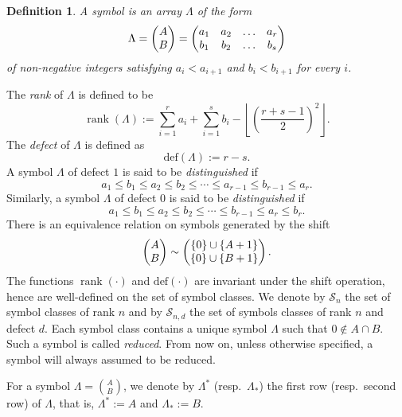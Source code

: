 \documentclass[12pt]{amsart}
\numberwithin{equation}{subsection}
\newtheorem{defn}[equation]{Definition}
\newcommand{\cS}{\mathcal{S}}
\newcommand{\rank}{\operatorname{rank}}
\def\defect{{\mathrm{def}}}
\begin{document}
\begin{defn} {\rm 
A \textit{symbol} is an array $\Lambda$ of the form 
\[ \Lambda=\left(\begin{matrix}  A\cr B\end{matrix}\right)=\left(\begin{matrix} a_1&a_2&\ldots&a_{r}\cr 
b_1&b_2&\ldots&b_{s}\end{matrix}\right)\]
of non-negative integers satisfying
 $a_i<a_{i+1}$ and $b_i<b_{i+1}$ for every $i$.}
\end{defn}
The \textit{rank}  of $\Lambda$ is defined to be
\[\rank(\Lambda):=\sum_{i=1}^r a_i+ \sum_{i=1}^s b_i-\left\lfloor\left(\frac{r+s-1}{2}\right)^2\right\rfloor.\]
The \textit{defect} of $\Lambda$ is defined as
\[\defect(\Lambda):=r-s.\]
A symbol $\Lambda$ of defect $1$  is said to be \textit{distinguished} if
\[a_1\le b_1\le a_2\le b_2\le\cdots\le a_{r-1}\le b_{r-1}\le a_{r}.\]
Similarly, a symbol $\Lambda$ of defect $0$ is said to be \textit{distinguished} if
\[a_1\le b_1\le a_2\le b_2\le\cdots\le b_{r-1}\le a_r\le b_r.\]
There is an equivalence relation on symbols generated by the shift
\begin{equation}
\left(\begin{matrix}  A\cr B\end{matrix}\right) \sim \left(\begin{matrix} \{0\}\cup\{A+1\}\cr  \{0\}\cup\{B+1\}\end{matrix}\right).
\end{equation}
The functions $\rank(\cdot)$ and $\defect(\cdot)$ are invariant under the shift operation, hence are well-defined on the set
of symbol classes.
We denote by $\cS_{n}$ the set of symbol classes of rank $n$ and by $\cS_{n,d}$ the set of symbols classes of rank $n$ and defect $d$.
Each symbol class contains a unique symbol $\Lambda$ such that $0\notin A\cap B$. Such a symbol is called \textit{reduced}. From now on, unless otherwise specified, a symbol will always assumed to be reduced.

For a symbol $\Lambda=\binom{A}{B}$, we denote by $\Lambda^\ast$ (resp.~$\Lambda_\ast$) the first row (resp.~second row)
of $\Lambda$, that is,  $\Lambda^\ast:=A$ and $\Lambda_\ast:=B$. 
\end{document}

